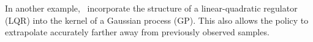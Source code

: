 In another example,~\textcite{marco2017design} incorporate the structure of a linear-quadratic regulator (LQR) into the kernel of a Gaussian process (GP). This also allows the policy to extrapolate accurately farther away from previously observed samples. \par


